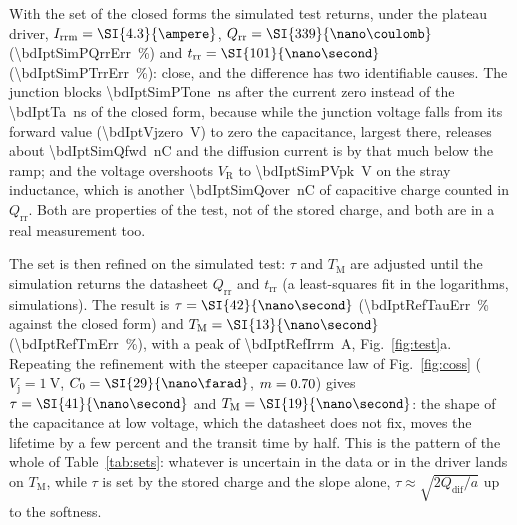 \documentclass[10pt,a4paper]{scrartcl}
\newcommand{\VR}{V_\mathrm{R}}
\newcommand{\Irrm}{I_\mathrm{rrm}}
\newcommand{\Qrr}{Q_\mathrm{rr}}
\newcommand{\Qdif}{Q_\mathrm{dif}}
\newcommand{\trr}{t_\mathrm{rr}}
\newcommand{\TM}{T_\mathrm{M}}
\newcommand{\Vj}{V_\mathrm{j}}
\newcommand{\Czero}{C_0}
\begin{document}
With the set of the closed forms the simulated test returns, under the plateau driver, $\Irrm = \SI{\bdIptSimPIrrm}{\ampere}$, $\Qrr = \SI{\bdIptSimPQrr}{\nano\coulomb}$ (\SI{\bdIptSimPQrrErr}{\percent}) and $\trr = \SI{\bdIptSimPTrr}{\nano\second}$ (\SI{\bdIptSimPTrrErr}{\percent}): close, and the difference has two identifiable causes. The junction blocks \SI{\bdIptSimPTone}{\nano\second} after the current zero instead of the \SI{\bdIptTa}{\nano\second} of the closed form, because while the junction voltage falls from its forward value (\SI{\bdIptVjzero}{\volt}) to zero the capacitance, largest there, releases about \SI{\bdIptSimQfwd}{\nano\coulomb} and the diffusion current is by that much below the ramp; and the voltage overshoots $\VR$ to \SI{\bdIptSimPVpk}{\volt} on the stray inductance, which is another \SI{\bdIptSimQover}{\nano\coulomb} of capacitive charge counted in $\Qrr$. Both are properties of the test, not of the stored charge, and both are in a real measurement too.

The set is then refined on the simulated test: $\tau$ and $\TM$ are adjusted until the simulation returns the datasheet $\Qrr$ and $\trr$ (a least-squares fit in the logarithms, \bdIptRefNsim{} simulations). The result is $\tau = \SI{\bdIptRefTau}{\nano\second}$ (\SI{\bdIptRefTauErr}{\percent} against the closed form) and $\TM = \SI{\bdIptRefTm}{\nano\second}$ (\SI{\bdIptRefTmErr}{\percent}), with a peak of \SI{\bdIptRefIrrm}{\ampere}, Fig.~\ref{fig:test}a. Repeating the refinement with the steeper capacitance law of Fig.~\ref{fig:coss} ($\Vj = \SI{1}{\volt}$, $\Czero = \SI{\bdIptAltCzero}{\nano\farad}$, $m = 0.70$) gives $\tau = \SI{\bdIptAltTau}{\nano\second}$ and $\TM = \SI{\bdIptAltTm}{\nano\second}$: the shape of the capacitance at low voltage, which the datasheet does not fix, moves the lifetime by a few percent and the transit time by half. This is the pattern of the whole of Table~\ref{tab:sets}: whatever is uncertain in the data or in the driver lands on $\TM$, while $\tau$ is set by the stored charge and the slope alone, $\tau \approx \sqrt{2\Qdif/a}$ up to the softness.
\end{document}
